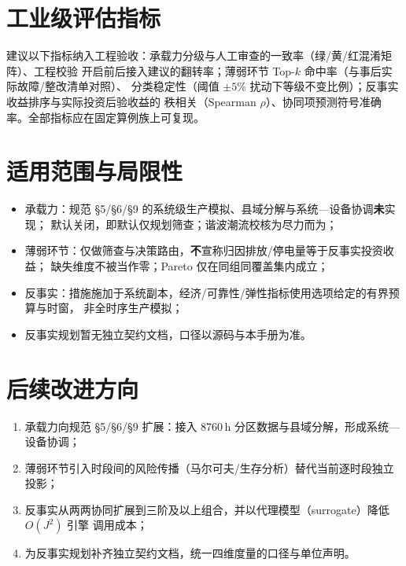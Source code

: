 \documentclass[UTF8,fontset=fandol,a4paper,11pt]{ctexart}
\begin{document}
\section{工业级评估指标}
建议以下指标纳入工程验收：承载力分级与人工审查的一致率（绿/黄/红混淆矩阵）、工程校验
开启前后接入建议的翻转率；薄弱环节 Top-$k$ 命中率（与事后实际故障/整改清单对照）、
分类稳定性（阈值 $\pm5\%$ 扰动下等级不变比例）；反事实收益排序与实际投资后验收益的
秩相关（Spearman $\rho$）、协同项预测符号准确率。全部指标应在固定算例族上可复现。

\section{适用范围与局限性}\label{sec:limits}
\begin{itemize}
  \item 承载力：规范 §5/§6/§9 的系统级生产模拟、县域分解与系统—设备协调\textbf{未}实现；
         默认关闭，即默认仅规划筛查；谐波潮流校核为尽力而为；
  \item 薄弱环节：仅做筛查与决策路由，\textbf{不}宣称归因排放/停电量等于反事实投资收益；
        缺失维度不被当作零；Pareto 仅在同组同覆盖集内成立；
  \item 反事实：措施施加于系统副本，经济/可靠性/弹性指标使用选项给定的有界预算与时窗，
        非全时序生产模拟；
  \item 反事实规划暂无独立契约文档，口径以源码与本手册为准。
\end{itemize}

\section{后续改进方向}
\begin{enumerate}
  \item 承载力向规范 §5/§6/§9 扩展：接入 8760\,h 分区数据与县域分解，形成系统—设备协调；
  \item 薄弱环节引入时段间的风险传播（马尔可夫/生存分析）替代当前逐时段独立投影；
  \item 反事实从两两协同扩展到三阶及以上组合，并以代理模型（surrogate）降低 $O(J^2)$ 引擎
        调用成本；
  \item 为反事实规划补齐独立契约文档，统一四维度量的口径与单位声明。
\end{enumerate}


\end{document}
